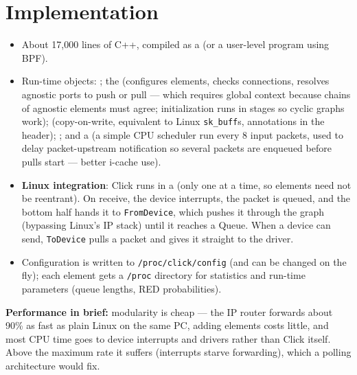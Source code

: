 \section{Implementation}
\begin{itemize}
\item About 17,000 lines of C++, compiled as a  (or a user-level program using BPF).
\item Run-time objects: ; the  (configures elements, checks connections, resolves agnostic ports to push or pull --- which requires global context because chains of agnostic elements must agree; initialization runs in stages so cyclic graphs work);  (copy-on-write, equivalent to Linux \texttt{sk\_buff}s, annotations in the header); ; and a  (a simple CPU scheduler run every 8 input packets, used to delay packet-upstream notification so several packets are enqueued before pulls start --- better i-cache use).
\item \textbf{Linux integration}: Click runs in a  (only one at a time, so elements need not be reentrant). On receive, the device interrupts, the packet is queued, and the bottom half hands it to \texttt{FromDevice}, which pushes it through the graph (bypassing Linux's IP stack) until it reaches a Queue. When a device can send, \texttt{ToDevice} pulls a packet and gives it straight to the driver.
\item Configuration is written to \texttt{/proc/click/config} (and can be changed on the fly); each element gets a \texttt{/proc} directory for statistics and run-time parameters (queue lengths, RED probabilities).
\end{itemize}
\textbf{Performance in brief:} modularity is cheap --- the IP router forwards about 90\% as fast as plain Linux on the same PC, adding elements costs little, and most CPU time goes to device interrupts and drivers rather than Click itself. Above the maximum rate it suffers  (interrupts starve forwarding), which a polling architecture would fix.

